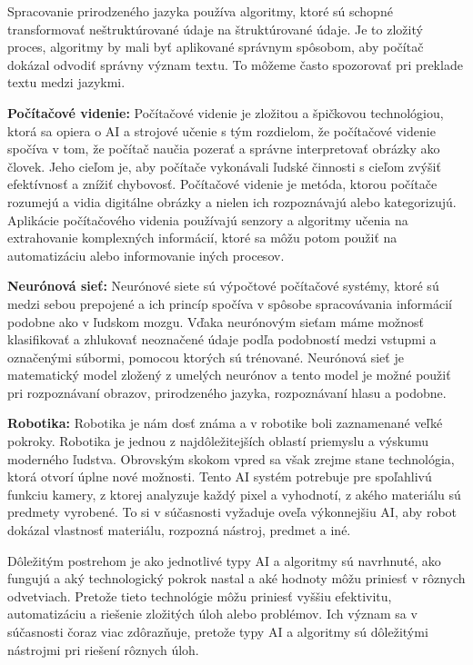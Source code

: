 Spracovanie prirodzeného jazyka používa algoritmy, ktoré sú schopné transformovať neštruktúrované údaje na štruktúrované údaje.  Je to zložitý proces, algoritmy by mali byť aplikované správnym spôsobom, aby počítač dokázal odvodiť správny význam textu.  To môžeme často spozorovať pri preklade textu medzi jazykmi.\cite{nelson_nlp}
\\
\par \textbf{Počítačové videnie:} Počítačové videnie je zložitou a špičkovou technológiou, ktorá sa opiera o AI a strojové učenie s tým rozdielom, že počítačové videnie spočíva v tom, že počítač naučia pozerať a správne interpretovať obrázky ako človek. \cite{chernyak_computer_vision} Jeho cieľom je, aby počítače vykonávali ľudské činnosti s cieľom zvýšiť efektívnosť a znížiť chybovosť. 
Počítačové videnie je metóda, ktorou počítače rozumejú a vidia digitálne obrázky a nielen ich rozpoznávajú alebo kategorizujú.  Aplikácie počítačového videnia používajú senzory a algoritmy učenia na extrahovanie komplexných informácií, ktoré sa môžu potom použiť na automatizáciu alebo informovanie iných procesov. \cite{sap_ai}
\\
\par \textbf{Neurónová sieť:} Neurónové siete sú výpočtové počítačové systémy, ktoré sú medzi sebou prepojené a ich princíp spočíva v spôsobe spracovávania informácií podobne ako v ľudskom mozgu.  Vďaka neurónovým sieťam máme možnosť klasifikovať a zhlukovať neoznačené údaje podľa podobností medzi vstupmi a označenými súbormi, pomocou ktorých sú trénované. \cite{krajci2020} Neurónová sieť je matematický model zložený z umelých neurónov a tento model je možné použiť pri rozpoznávaní obrazov, prirodzeného jazyka, rozpoznávaní hlasu a podobne. 
\\
\par\textbf{Robotika:} Robotika je nám dosť známa a v robotike boli zaznamenané veľké pokroky. Robotika je jednou z najdôležitejších oblastí priemyslu a výskumu moderného ľudstva.  Obrovským skokom vpred sa však zrejme stane technológia, ktorá otvorí úplne nové možnosti.  Tento AI systém potrebuje pre spoľahlivú funkciu kamery, z ktorej analyzuje každý pixel a vyhodnotí, z akého materiálu sú predmety vyrobené.  To si v súčasnosti vyžaduje oveľa výkonnejšiu AI, aby robot dokázal vlastnosť materiálu, rozpozná nástroj, predmet a iné. \cite{tokoly_technologia}
\par Dôležitým postrehom je ako jednotlivé typy AI a algoritmy sú navrhnuté, ako fungujú a aký technologický pokrok nastal a aké hodnoty môžu priniesť v rôznych odvetviach. Pretože tieto technológie môžu priniesť vyššiu efektivitu, automatizáciu a riešenie zložitých úloh alebo problémov. Ich význam sa v súčasnosti čoraz viac zdôrazňuje, pretože typy AI a algoritmy sú dôležitými nástrojmi pri riešení rôznych úloh.



